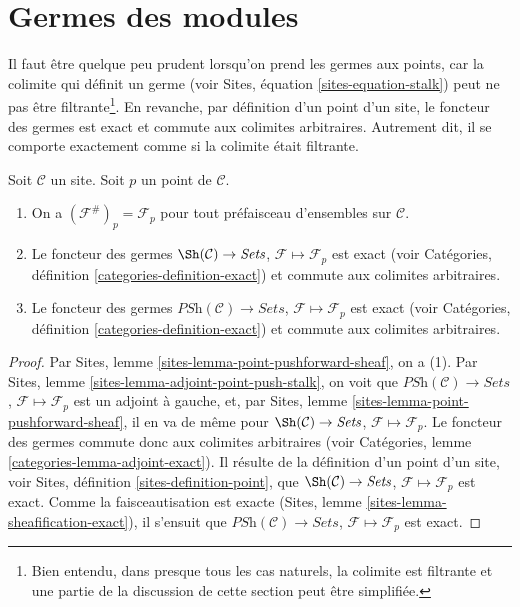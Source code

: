 \section{Germes des modules}
\label{section-stalks}

\noindent
Il faut être quelque peu prudent lorsqu'on prend les germes aux points, car la
colimite qui définit un germe (voir Sites, équation
\ref{sites-equation-stalk}) peut ne pas être filtrante\footnote{Bien entendu,
dans presque tous les cas naturels, la colimite est filtrante et une partie de
la discussion de cette section peut être simplifiée.}. En revanche, par
définition d'un point d'un site, le foncteur des germes est exact et commute aux
colimites arbitraires. Autrement dit, il se comporte exactement comme si la
colimite était filtrante.

\begin{lemma}
\label{lemma-stalk-exact}
Soit $\mathcal{C}$ un site.
Soit $p$ un point de $\mathcal{C}$.
\begin{enumerate}
\item On a $(\mathcal{F}^\#)_p = \mathcal{F}_p$
pour tout préfaisceau d'ensembles sur $\mathcal{C}$.
\item Le foncteur des germes
$\Sh(\mathcal{C}) \to \textit{Sets}$,
$\mathcal{F} \mapsto \mathcal{F}_p$ est exact (voir
Catégories, définition \ref{categories-definition-exact})
et commute aux colimites arbitraires.
\item Le foncteur des germes
$\textit{PSh}(\mathcal{C}) \to \textit{Sets}$,
$\mathcal{F} \mapsto \mathcal{F}_p$ est exact (voir
Catégories, définition \ref{categories-definition-exact})
et commute aux colimites arbitraires.
\end{enumerate}
\end{lemma}

\begin{proof}
Par Sites, lemme \ref{sites-lemma-point-pushforward-sheaf}, on a (1).
Par Sites, lemme \ref{sites-lemma-adjoint-point-push-stalk}, on voit que
$\textit{PSh}(\mathcal{C}) \to \textit{Sets}$,
$\mathcal{F} \mapsto \mathcal{F}_p$ est un adjoint à gauche, et, par
Sites, lemme \ref{sites-lemma-point-pushforward-sheaf}, il en va de même pour
$\Sh(\mathcal{C}) \to \textit{Sets}$,
$\mathcal{F} \mapsto \mathcal{F}_p$.
Le foncteur des germes commute donc aux colimites arbitraires (voir
Catégories, lemme \ref{categories-lemma-adjoint-exact}).
Il résulte de la définition d'un point d'un site, voir
Sites, définition \ref{sites-definition-point}, que
$\Sh(\mathcal{C}) \to \textit{Sets}$,
$\mathcal{F} \mapsto \mathcal{F}_p$
est exact. Comme la faisceautisation est exacte
(Sites, lemme \ref{sites-lemma-sheafification-exact}), il s'ensuit que
$\textit{PSh}(\mathcal{C}) \to \textit{Sets}$,
$\mathcal{F} \mapsto \mathcal{F}_p$
est exact.
\end{proof}

